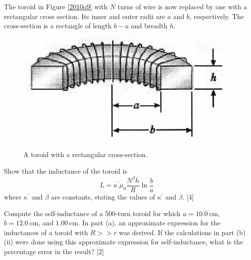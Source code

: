 \begin{problem}
    \begin{subproblem}
        The toroid in Figure \ref{2010q9} with $N$ turns of wire is now replaced by one with a rectangular cross section. Its inner and outer radii are $a$ and $b$, respectively. The cross-section is a rectangle of length $b-a$ and breadth $h$.
        \begin{figure}[hbt!]
	          \centering
	        \includegraphics[width=0.8\linewidth]{spho_book_TYS_images/2010q9_2.png}
	        \caption{A toroid with a rectangular cross-section.} \label{2010q9_2}
        \end{figure}
        \begin{subproblem}
            Show that the inductance of the toroid is
            \[L=\kappa^{\prime} \mu_{0} \frac{N^{\beta} h}{R} \ln \frac{b}{a}\]
            where $\kappa^{\prime}$ and $\beta$ are constants, stating the values of $\kappa^{\prime}$ and $\beta$.
        \hfill{[4]}\end{subproblem}

        \begin{subproblem}
            Compute the self-inductance of a 500-turn toroid for which $a=\qty{10.0}{\cm}$, $b=\qty{12.0}{\cm}$, and $\qty{1.00}{\cm}$. In part (a), an approximate expression for the inductances of a toroid with $R>>r$ was derived. If the calculations in part (b) (ii) were done using this approximate expression for self-inductance, what is the percentage error in the result?
        \hfill{[2]}\end{subproblem}
    \end{subproblem}
\end{problem}

